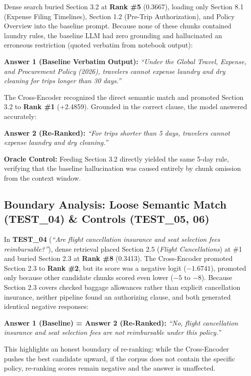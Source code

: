 \documentclass[11pt,a4paper]{article}
\newenvironment{answerquote}{%
  \begin{list}{}{%
    \setlength{\leftmargin}{1.0em}%
    \setlength{\rightmargin}{1.0em}%
    \setlength{\topsep}{2pt}%
    \setlength{\partopsep}{0pt}%
    \setlength{\parsep}{0pt}%
    \setlength{\itemsep}{0pt}%
  }%
  \item\small\itshape
}{%
  \end{list}%
}
\begin{document}
Dense search buried Section 3.2 at \textbf{Rank \#5} (0.3667), loading only Section 8.1 (Expense Filing Timelines), Section 1.2 (Pre-Trip Authorization), and Policy Overview into the baseline prompt. Because none of these chunks contained laundry rules, the baseline LLM had zero grounding and hallucinated an erroneous restriction (quoted verbatim from notebook output):
\begin{answerquote}
\textbf{Answer 1 (Baseline Verbatim Output):} \textit{``Under the Global Travel, Expense, and Procurement Policy (2026), travelers cannot expense laundry and dry cleaning for trips longer than 30 days.''}
\end{answerquote}
The Cross-Encoder recognized the direct semantic match and promoted Section 3.2 to \textbf{Rank \#1} (+2.4859). Grounded in the correct clause, the model answered accurately:
\begin{answerquote}
\textbf{Answer 2 (Re-Ranked):} \textit{``For trips shorter than 5 days, travelers cannot expense laundry and dry cleaning.''}
\end{answerquote}
\textbf{Oracle Control:} Feeding Section 3.2 directly yielded the same 5-day rule, verifying that the baseline hallucination was caused entirely by chunk omission from the context window.

\subsection{Boundary Analysis: Loose Semantic Match (TEST\_04) \& Controls (TEST\_05, 06)}
In \textbf{TEST\_04} (\textit{``Are flight cancellation insurance and seat selection fees reimbursable?''}), dense retrieval placed Section 2.5 (\textit{Flight Cancellations}) at \#1 and buried Section 2.3 at \textbf{Rank \#8} (0.3413). The Cross-Encoder promoted Section 2.3 to \textbf{Rank \#2}, but its score was a negative logit ($-1.6741$), promoted only because other candidate chunks scored even lower ($-5$ to $-8$). Because Section 2.3 covers checked baggage allowances rather than explicit cancellation insurance, neither pipeline found an authorizing clause, and both generated identical negative responses:
\begin{answerquote}
\textbf{Answer 1 (Baseline) = Answer 2 (Re-Ranked):} \textit{``No, flight cancellation insurance and seat selection fees are not reimbursable under this policy.''}
\end{answerquote}
This highlights an honest boundary of re-ranking: while the Cross-Encoder pushes the best candidate upward, if the corpus does not contain the specific policy, re-ranking scores remain negative and the answer is unaffected.
\end{document}
